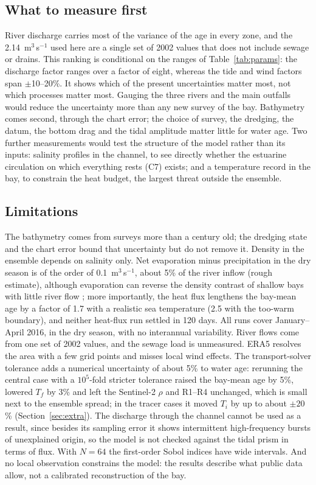 \documentclass[a4paper,fleqn]{ems-dc}
\begin{document}
\subsection{What to measure first}
River discharge carries most of the variance of the age in every zone, and the
2.14~m$^3$\,s$^{-1}$ used here are a single set of 2002 values that does not include sewage
or drains. This ranking is conditional on the ranges of Table~\ref{tab:params}: the
discharge factor ranges over a factor of eight, whereas the tide and wind factors span
$\pm$10--20\%. It shows which of the present uncertainties matter most, not which processes
matter most. Gauging the three rivers and the main outfalls would reduce the uncertainty more
than any new survey of the bay. Bathymetry comes second, through the chart error; the choice
of survey, the dredging, the datum, the bottom drag and the tidal amplitude matter little for
water age. Two further measurements would test the structure of the model rather than its
inputs: salinity profiles in the channel, to see directly whether the estuarine circulation
on which everything rests (C7) exists; and a temperature record in the bay, to constrain the
heat budget, the largest threat outside the ensemble.

\subsection{Limitations}
The bathymetry comes from surveys more than a century old; the dredging state and the chart
error bound that uncertainty but do not remove it. Density in the ensemble depends on
salinity only. Net evaporation minus precipitation in the dry season is of the order of
0.1~m$^3$\,s$^{-1}$, about 5\% of the river inflow (rough estimate), although evaporation can reverse the density
contrast of shallow bays with little river flow \citep{Largier1997}; more importantly, the heat flux
lengthens the bay-mean age by a factor of 1.7 with a realistic sea temperature (2.5 with the
too-warm boundary), and neither heat-flux run settled in 120 days. All runs cover
January--April 2016, in the dry season, with no interannual variability. River flows come
from one set of 2002 values, and the sewage load is unmeasured. ERA5 resolves the area with a few
grid points and misses local wind effects. The transport-solver tolerance adds a numerical
uncertainty of about 5\% to water age: rerunning the central case with a $10^5$-fold stricter
tolerance raised the bay-mean age by 5\%, lowered $T_f$ by 3\% and left the Sentinel-2
$\rho$ and R1--R4 unchanged, which is small next to the ensemble spread; in the tracer cases
it moved $T_i$ by up to about $\pm20$\% (Section~\ref{sec:extra}). The discharge through the
channel cannot be used as a result, since besides its sampling error it shows intermittent
high-frequency bursts of unexplained origin, so the model is not checked against the tidal
prism in terms of flux. With $N = 64$ the first-order Sobol indices have wide intervals. And
no local observation constrains the model: the results describe what public data allow,
not a calibrated reconstruction of the bay.
\end{document}
